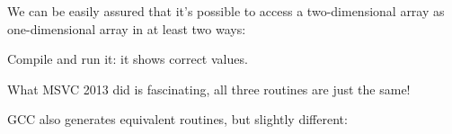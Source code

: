 ﻿

We can be easily assured that it's possible to access a two-dimensional array as one-dimensional array in at least two ways:



Compile and run it: it shows correct values.

What MSVC 2013 did is fascinating, all three routines are just the same!



GCC also generates equivalent routines, but slightly different:



